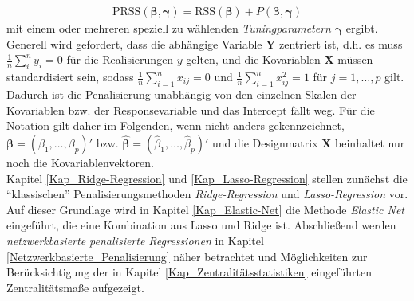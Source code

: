 \documentclass[12pt, a4paper]{report}\usepackage[]{graphicx}\usepackage[]{color}
\begin{document}
\begin{align}\label{Eq_PRSS_allgmein}
\text{PRSS}(\boldsymbol{\beta},\boldsymbol{\gamma})=\text{RSS}(\boldsymbol{\beta}) + P(\boldsymbol{\beta}, \boldsymbol{\gamma})
\end{align} mit einem oder mehreren speziell zu wählenden \textit{Tuningparametern} $\boldsymbol{\gamma}$ ergibt. Generell wird gefordert, dass die abhängige Variable $\mathbf{Y}$ zentriert ist, d.h. es muss $\frac{1}{n}\sum_{i}^{n}y_i =0$ für die Realisierungen $y$ gelten, und die Kovariablen $\mathbf{X}$ müssen standardisiert sein, sodass $\frac{1}{n}\sum_{i=1}^{n}x_{ij}=0$ und $\frac{1}{n}\sum_{i=1}^{n}x_{ij}^2=1$ für $j=1,\dots,p$ gilt. Dadurch ist die Penalisierung unabhängig von den einzelnen Skalen der Kovariablen bzw. der Responsevariable und das Intercept fällt weg. Für die Notation gilt daher im Folgenden, wenn nicht anders gekennzeichnet, $\boldsymbol{\beta}=(\beta_1,\dots,\beta_p)'$ bzw. $\boldsymbol{\hat{\beta}}=(\hat{\beta}_1,\dots,\hat{\beta}_p)'$ und die Designmatrix $\mathbf{X}$ beinhaltet nur noch die Kovariablenvektoren.\\
Kapitel \ref{Kap_Ridge-Regression} und \ref{Kap_Lasso-Regression} stellen zunächst die "`klassischen"' Penalisierungsmethoden \textit{Ridge-Regression} und \textit{Lasso-Regression} vor. Auf dieser Grundlage wird in Kapitel \ref{Kap_Elastic-Net} die Methode \textit{Elastic Net} eingeführt, die eine Kombination aus Lasso und Ridge ist. Abschließend werden \textit{netzwerkbasierte penalisierte Regressionen} in Kapitel \ref{Netzwerkbasierte_Penalisierung} näher betrachtet und Möglichkeiten zur Berücksichtigung der in Kapitel \ref{Kap_Zentralitätsstatistiken} eingeführten Zentralitätsmaße aufgezeigt.
\begin{comment}
Unverzerrtheit des $\hat{\beta}$ der Kleinste-Quadratmethode wird geopfert, um den \textit{mittleren quadratischen Fehler} (englisch: mean squared error; \textit{MSE}) zu senken\\
Ridge wird eingeführt, weil Teil von Elastic Net\\
kein Intercept (bei allen Penalisierungen?); durch Standardisierung bzw. Zentralisierung fällt $\beta_0$ weg \cite{montgomery2012introduction}\\
warum keine Subsetselection\\
hat penalisierung, auch die netzwerkbasierte, was baysianisches?\\
!!\\
LAGARGIAN MULTIPLIER?????\\
penalized bestraft größere Beta mehr - intercept raus, weil sonst bestrafung nicht unabhängig von der skala des outcomes wäre!!! (für allgemeine einführung: http://web.as.uky.edu/statistics/users/pbreheny/764-F11/notes/8-30.pdf)
\end{comment}
\end{document}
